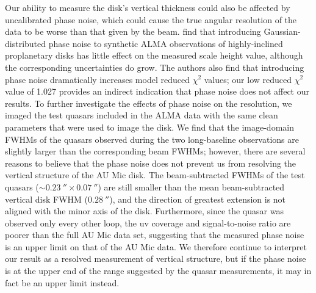 \documentclass[modern]{aastex62}
\begin{document}
Our ability to measure the disk's vertical thickness could also be affected by uncalibrated phase noise, which could cause the true angular resolution of the data to be worse than that given by the beam.
\citet{boehler13} find that introducing Gaussian-distributed phase noise to synthetic ALMA observations of highly-inclined proplanetary disks has little effect on the measured scale height value, although the corresponding uncertainties do grow.
The authors also find that introducing phase noise dramatically increases model reduced $\chi^2$ values; our low reduced $\chi^2$ value of 1.027 provides an indirect indication that phase noise does not affect our results.
To further investigate the effects of phase noise on the resolution, we imaged the test quasars included in the ALMA data with the same clean parameters that were used to image the disk.
We find that the image-domain FWHMs of the quasars observed during the two long-baseline observations are slightly larger than the corresponding beam FWHMs; however, there are several reasons to believe that the phase noise does not prevent us from resolving the vertical structure of the AU Mic disk. The beam-subtracted FWHMs of the test quasars ($\sim \SI{0.23}{\arcsecond} \times \SI{0.07}{\arcsecond}$) are still smaller than the mean beam-subtracted vertical disk FWHM ($\SI{0.28}{\arcsecond}$), and the direction of greatest extension is not aligned with the minor axis of the disk.  Furthermore, since the quasar was observed only every other loop, the uv coverage and signal-to-noise ratio are poorer than the full AU Mic data set, suggesting that the measured phase noise is an upper limit on that of the AU Mic data.  We therefore continue to interpret our result as a resolved measurement of vertical structure, but if the phase noise is at the upper end of the range suggested by the quasar measurements, it may in fact be an upper limit instead.
\end{document}
